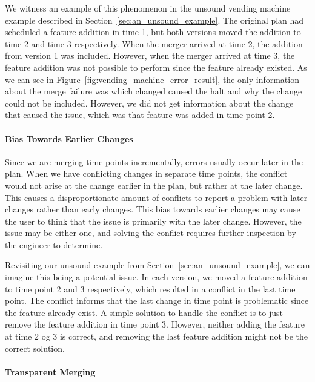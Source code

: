 \documentclass[a4paper,english]{ifimaster}
\begin{document}
We witness an example of this phenomenon in the unsound vending machine example described in Section~\vref{sec:an_unsound_example}. The original plan had scheduled a feature addition in time 1, but both versions moved the addition to time 2 and time 3 respectively. When the merger arrived at time 2, the addition from version 1 was included. However, when the merger arrived at time 3, the feature addition was not possible to perform since the feature already existed. As we can see in Figure~\vref{fig:vending_machine_error_result}, the only information about the merge failure was which changed caused the halt and why the change could not be included. However, we did not get information about the change that caused the issue, which was that feature was added in time point 2.

\paragraph{Bias Towards Earlier Changes}%
\label{par:bias_towards_earlier_time_points}

Since we are merging time points incrementally, errors usually occur later in the plan. When we have conflicting changes in separate time points, the conflict would not arise at the change earlier in the plan, but rather at the later change. This causes a disproportionate amount of conflicts to report a problem with later changes rather than early changes. This bias towards earlier changes may cause the user to think that the issue is primarily with the later change. However, the issue may be either one, and solving the conflict requires further inspection by the engineer to determine.

Revisiting our unsound example from Section~\vref{sec:an_unsound_example}, we can imagine this being a potential issue. In each version, we moved a feature addition to time point 2 and 3 respectively, which resulted in a conflict in the last time point. The conflict informs that the last change in time point is problematic since the feature already exist. A simple solution to handle the conflict is to just remove the feature addition in time point 3. However, neither adding the feature at time 2 og 3 is correct, and removing the last feature addition might not be the correct solution.

\paragraph{Transparent Merging}%
\label{par:transparent_merging}
\end{document}
